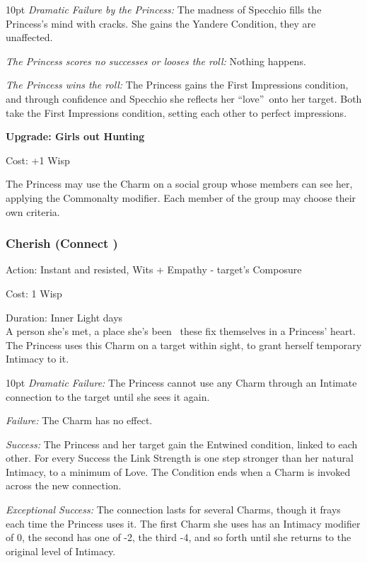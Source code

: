 \begin{myindentpar}{10pt}    \emph{Dramatic Failure by the Princess:} The madness of Specchio fills the Princess's mind with cracks. She gains the Yandere Condition, they are unaffected.

\emph{The Princess scores no successes or looses the roll:} Nothing happens.

\emph{The Princess wins the roll:} The Princess gains the First Impressions condition, and through confidence and Specchio she reflects her \textquotedblleft love\textquotedblright\, onto her target. Both take the First Impressions condition, setting each other to perfect impressions. 

\textbf{Upgrade: Girls out Hunting}

\noindent Cost: +1 Wisp

The Princess may use the Charm on a social group whose members can see her, applying the Commonalty modifier. Each member of the group may choose their own criteria. 

\end{myindentpar}

\subsubsection*{Cherish (Connect \textbullet\textbullet\textbullet)}

\noindent Action: Instant and resisted, Wits + Empathy - target's Composure

\noindent Cost: 1 Wisp

\noindent Duration: Inner Light days \\

\noindent A person she's met, a place she's been \textendash\, these fix themselves in a Princess' heart. The Princess uses this Charm on a target within sight, to grant herself temporary Intimacy to it.

   \begin{myindentpar}{10pt} \emph{Dramatic Failure:} The Princess cannot use any Charm through an Intimate connection to the target until she sees it again.
   
    \emph{Failure:} The Charm has no effect.
	
    \emph{Success:} The Princess and her target gain the Entwined condition, linked to each other. For every Success the Link Strength is one step stronger than her natural Intimacy, to a minimum of Love. The Condition ends when a Charm is invoked across the new connection. 
	
    \emph{Exceptional Success:} The connection lasts for several Charms, though it frays each time the Princess uses it. The first Charm she uses has an Intimacy modifier of 0, the second has one of -2, the third -4, and so forth until she returns to the original level of Intimacy.\end{myindentpar}

